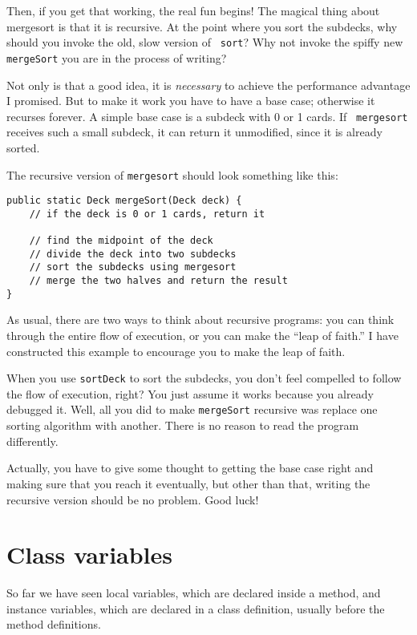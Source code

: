 \documentclass[12pt]{book}
\theoremstyle{definition}
\begin{document}
Then, if you get that working, the real fun begins!  The magical thing
about mergesort is that it is recursive.  At the point where you sort
the subdecks, why should you invoke the old, slow version of {\tt
sort}?  Why not invoke the spiffy new {\tt mergeSort} you are in the
process of writing?

Not only is that a good idea, it is {\em necessary} to
achieve the performance advantage I promised.  But to make it
work you have to have a base case; otherwise it recurses
forever.  A simple base case is a subdeck with 0 or 1 cards.  If {\tt
mergesort} receives such a small subdeck, it can return it
unmodified, since it is already sorted.

The recursive version of {\tt mergesort} should look something
like this:

\begin{lstlisting}
public static Deck mergeSort(Deck deck) {
    // if the deck is 0 or 1 cards, return it

    // find the midpoint of the deck
    // divide the deck into two subdecks
    // sort the subdecks using mergesort
    // merge the two halves and return the result
}
\end{lstlisting}
%
As usual, there are two ways to think about recursive programs:
you can think through the entire flow of execution, or you
can make the ``leap of faith.''  I have constructed
this example to encourage you to make the leap of faith.

When you use {\tt sortDeck} to sort the subdecks, you don't
feel compelled to follow the flow of execution, right?  You just
assume it works because you already
debugged it.  Well, all you did to make {\tt mergeSort} recursive was
replace one sorting algorithm with another.  There is no reason to read
the program differently.

Actually, you have to give some thought to getting the
base case right and making sure that you reach it eventually,
but other than that, writing the recursive version should be
no problem.  Good luck!


\section{Class variables}

So far we have seen local variables, which are declared inside
a method, and instance variables, which are declared in a class
definition, usually before the method definitions.
\end{document}

